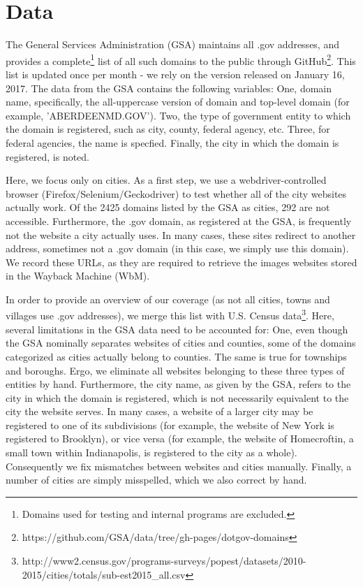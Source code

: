 \documentclass[11pt]{article}
\begin{document}
\section{Data}
The General Services Administration (GSA) maintains all .gov addresses, and provides a complete\footnote{Domains used for testing and internal programs are excluded.} list of all such domains to the public through GitHub\footnote{https://github.com/GSA/data/tree/gh-pages/dotgov-domains}. This list is updated once per month - we rely on the version released on January 16, 2017. The data from the GSA contains the following variables: One, domain name, specifically, the all-uppercase version of domain and top-level domain (for example, 'ABERDEENMD.GOV'). Two, the type of government entity to which the domain is registered, such as city, county, federal agency, etc. Three, for federal agencies, the name is specfied. Finally, the city in which the domain is registered, is noted.

Here, we focus only on cities. As a first step, we use a webdriver-controlled browser (Firefox/Selenium/Geckodriver) to test whether all of the city websites actually work. Of the 2425 domains listed by the GSA as cities, 292 are not accessible. Furthermore, the .gov domain, as registered at the GSA, is frequently not the website a city actually uses. In many cases, these sites redirect to another address, sometimes not a .gov domain (in this case, we simply use this domain). We record these URLs, as they are required to retrieve the images websites stored in the Wayback Machine (WbM).

In order to provide an overview of our coverage (as not all cities, towns and villages use .gov addresses), we merge this list with U.S. Census data\footnote{http://www2.census.gov/programs-surveys/popest/datasets/2010-2015/cities/totals/sub-est2015\_all.csv}. Here, several limitations in the GSA data need to be accounted for: One, even though the GSA nominally separates websites of cities and counties, some of the domains categorized as cities actually belong to counties. The same is true for townships and boroughs. Ergo, we eliminate all websites belonging to these three types of entities by hand. Furthermore, the city name, as given by the GSA, refers to the city in which the domain is registered, which is not necessarily equivalent to the city the website serves. In many cases, a website of a larger city may be registered to one of its subdivisions (for example, the website of New York is registered to Brooklyn), or vice versa (for example, the website of Homecroftin, a small town within Indianapolis, is registered to the city as a whole). Consequently we fix mismatches between websites and cities manually. Finally, a number of cities are simply misspelled, which we also correct by hand.
\end{document}
